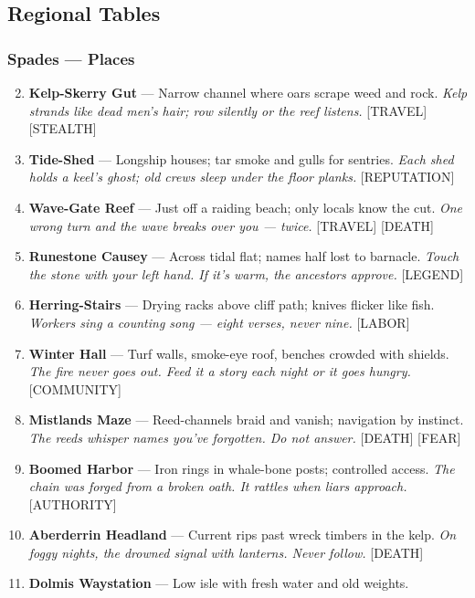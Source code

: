 \subsection*{Regional Tables}

\subsubsection*{Spades --- Places}
\label{sec:linn-places}
\begin{enumerate}
\setcounter{enumi}{1}
\item \textbf{Kelp-Skerry Gut} --- Narrow channel where oars scrape weed and rock.
  \hfill \textit{Kelp strands like dead men's hair; row silently or the reef listens.} [TRAVEL] [STEALTH]
\item \textbf{Tide-Shed} --- Longship houses; tar smoke and gulls for sentries.
  \hfill \textit{Each shed holds a keel's ghost; old crews sleep under the floor planks.} [REPUTATION]
\item \textbf{Wave-Gate Reef} --- Just off a raiding beach; only locals know the cut.
  \hfill \textit{One wrong turn and the wave breaks over you --- twice.} [TRAVEL] [DEATH]
\item \textbf{Runestone Causey} --- Across tidal flat; names half lost to barnacle.
  \hfill \textit{Touch the stone with your left hand. If it's warm, the ancestors approve.} [LEGEND]
\item \textbf{Herring-Stairs} --- Drying racks above cliff path; knives flicker like fish.
  \hfill \textit{Workers sing a counting song --- eight verses, never nine.} [LABOR]
\item \textbf{Winter Hall} --- Turf walls, smoke-eye roof, benches crowded with shields.
  \hfill \textit{The fire never goes out. Feed it a story each night or it goes hungry.} [COMMUNITY]
\item \textbf{Mistlands Maze} --- Reed-channels braid and vanish; navigation by instinct.
  \hfill \textit{The reeds whisper names you've forgotten. Do not answer.} [DEATH] [FEAR]
\item \textbf{Boomed Harbor} --- Iron rings in whale-bone posts; controlled access.
  \hfill \textit{The chain was forged from a broken oath. It rattles when liars approach.} [AUTHORITY]
\item \textbf{Aberderrin Headland} --- Current rips past wreck timbers in the kelp.
  \hfill \textit{On foggy nights, the drowned signal with lanterns. Never follow.} [DEATH]
\item[J] \textbf{Dolmis Waystation} --- Low isle with fresh water and old weights.

\end{enumerate}
